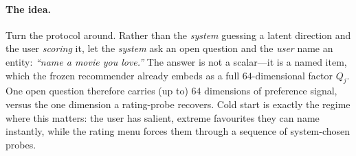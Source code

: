\documentclass[11pt]{article}
\begin{document}
\paragraph{The idea.} Turn the protocol around. Rather than the \emph{system} guessing a latent direction and the user
\emph{scoring} it, let the \emph{system} ask an open question and the \emph{user} name an entity:
\emph{``name a movie you love.''} The answer is not a scalar---it is a named item, which the frozen recommender already
embeds as a full $64$-dimensional factor $Q_j$. One open question therefore carries (up to) $64$ dimensions of
preference signal, versus the one dimension a rating-probe recovers. Cold start is exactly the regime where this
matters: the user has salient, extreme favourites they can name instantly, while the rating menu forces them through a
sequence of system-chosen probes.
\end{document}
